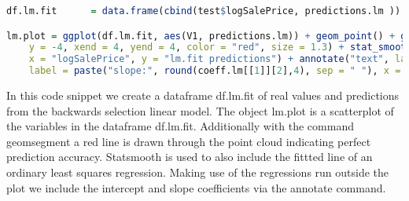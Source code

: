 \begin{lstlisting}[language=R]
df.lm.fit      = data.frame(cbind(test$logSalePrice, predictions.lm ))  # creating dataframe containing real and predicted outcome

lm.plot = ggplot(df.lm.fit, aes(V1, predictions.lm)) + geom_point() + geom_segment(x = -4, 
    y = -4, xend = 4, yend = 4, color = "red", size = 1.3) + stat_smooth(method = "lm", se = FALSE) + labs(title = "Backward selection linear model", 
    x = "logSalePrice", y = "lm.fit predictions") + annotate("text", label = paste("int:", round(coeff.lm[[1]][1],4), sep = " "), x = -3, y = 3, size =10, color = "blue") + annotate("text", 
    label = paste("slope:", round(coeff.lm[[1]][2],4), sep = " "), x = -3, y = 2.5, size =10, color = "blue") + theme_classic(base_size = 20) 
\end{lstlisting} 
In this code snippet we create a dataframe df.lm.fit of real values and predictions from the backwards selection linear model. The object lm.plot is a scatterplot of the variables in the dataframe df.lm.fit. Additionally with the command geomsegment a red line is drawn through the point cloud indicating perfect prediction accuracy. Statsmooth is used to also include the fittted line of an ordinary least squares regression. Making use of the regressions run outside the plot we include the intercept and slope coefficients via the annotate command.   